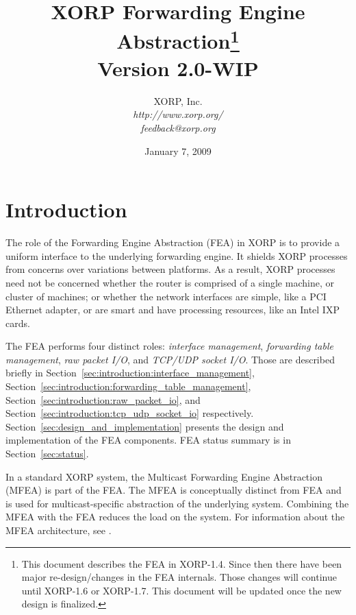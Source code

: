 \documentclass[11pt]{article}
\begin{document}
\title{XORP Forwarding Engine Abstraction\footnote{This document describes the
    FEA in XORP-1.4. Since then there have been major re-design/changes in the
    FEA internals. Those changes will continue until XORP-1.6 or XORP-1.7.
    This document will be updated once the new design is finalized.} \\ 
\vspace{1ex}
Version 2.0-WIP}
\author{ XORP, Inc.					\\
         {\it http://www.xorp.org/}			\\
	 {\it feedback@xorp.org}
}
\date{January 7, 2009}

\maketitle


\section{Introduction}
\label{sec:introduction}

The role of the Forwarding Engine Abstraction (FEA) in XORP is to
provide a uniform interface to the underlying forwarding engine.  It
shields XORP processes from concerns over variations between
platforms.  As a result, XORP processes need not be concerned whether
the router is comprised of a single machine, or cluster of machines;
or whether the network interfaces are simple, like a PCI Ethernet
adapter, or are smart and have processing resources, like an Intel IXP
cards.

The FEA performs four distinct roles: \emph{interface management},
\emph{forwarding table management}, \emph{raw packet I/O},
and \emph{TCP/UDP socket I/O}.  Those are
described briefly in
Section~\ref{sec:introduction:interface_management},
Section~\ref{sec:introduction:forwarding_table_management},
Section~\ref{sec:introduction:raw_packet_io},
and Section~\ref{sec:introduction:tcp_udp_socket_io}
respectively.
Section~\ref{sec:design_and_implementation} presents
the design and implementation of the FEA components.
FEA status summary is in Section~\ref{sec:status}.

In a standard XORP system, the Multicast Forwarding Engine Abstraction
(MFEA) is part of the FEA.  The MFEA is conceptually distinct from
FEA and is used for multicast-specific abstraction of the underlying system.
Combining the MFEA with the FEA reduces the load on the system.  For
information about the MFEA architecture, see \cite{xorp:mfea}.
\end{document}
